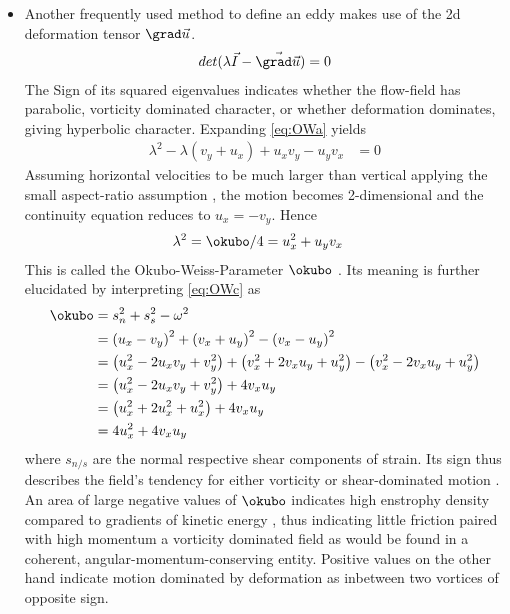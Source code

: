 \begin{itemize}
\item
Another frequently used method to define an eddy makes use of the 2d deformation tensor $\grad \vec{u}$.
\begin{align}
det(\lambda\vec{I}- \vec{\grad \vec{u}}) =0 \label{eq:OWa}
\end{align}
The Sign of its squared eigenvalues indicates whether the flow-field has parabolic, vorticity dominated character, or whether deformation dominates, giving hyperbolic character. Expanding \eqref{eq:OWa} yields
\begin{align}
\lambda^{2}
-\lambda
\left( v_{y} + u_{x} \right)
+ u_{x} v_{y}
- u_{y} v_{x}
&=
0 \label{eq:OWb}
\end{align}
Assuming horizontal velocities to be much larger than vertical \ie applying the small aspect-ratio assumption \citet{olbers2012ocean}, the motion becomes 2-dimensional and the continuity equation reduces to $u_{x} = -v_{y}$. Hence 
\begin{align}
\lambda^{2}
&=
\okubo/4
=
 u_{x}^{2}
 +u_{y} v_{x} \label{eq:OWc}
\end{align}
	This is called the Okubo-Weiss-Parameter $\okubo$ \citep{Okubo1970}.
Its meaning is further elucidated by interpreting \eqref{eq:OWc} as
\begin{align}
\okubo	
	&=
	s_{n}^{2}
	+
	s_{s}^{2}
	-
	\omega^{2} \\
	&=
	\left( u_{x} - v_{y} \right)^{2}
	+
	\left( v_{x} + u_{y} \right)^{2}
	-
	\left( v_{x} - u_{y} \right)^{2} \nonumber \\
	&=
	\left( u_{x}^{2} - 2u_{x}v_{y} + v_{y}^{2}\right)
	+
	\left( v_{x}^{2} + 2v_{x}u_{y} + u_{y}^{2}\right)
	-
	\left( v_{x}^{2} - 2v_{x}u_{y} + u_{y}^{2}\right) \nonumber \\
	&=
	\left( u_{x}^{2} - 2u_{x}v_{y} + v_{y}^{2}\right)
	+
 4v_{x}u_{y}\nonumber \\
	&=
	\left( u_{x}^{2} + 2u_{x}^{2} + u_{x}^{2}\right)
	+
 4v_{x}u_{y}\nonumber \\
	&=
4 u_{x}^{2} 
	+
 4v_{x}u_{y} \nonumber
\end{align}
where $s_{n/s}$ are the normal respective shear components of strain. Its sign thus describes the field's tendency for either vorticity or shear-dominated motion \citet{Isern-Fontanet2006}.
	 An area of large negative values of $\okubo$ indicates high enstrophy density compared to gradients of kinetic energy \cite{Weiss1991}, thus indicating little friction paired with high momentum \ie a vorticity dominated field as would be found in a coherent, angular-momentum-conserving entity. Positive values on the other hand indicate motion dominated by deformation as \eg inbetween two vortices of opposite sign.
	 

\end{itemize}
